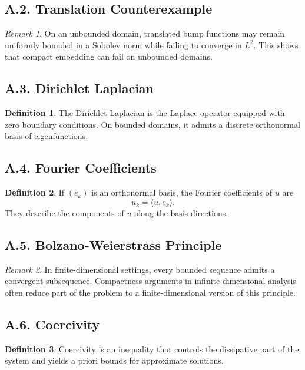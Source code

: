\documentclass[11pt]{article}
\theoremstyle{definition}
\newtheorem{definition}{Definition}
\theoremstyle{remark}
\newtheorem{remark}{Remark}
\begin{document}
\subsection*{A.2. Translation Counterexample}
\begin{remark}
On an unbounded domain, translated bump functions may remain uniformly bounded in a Sobolev norm while failing to converge in \(L^2\). This shows that compact embedding can fail on unbounded domains.
\end{remark}

\subsection*{A.3. Dirichlet Laplacian}
\begin{definition}
The Dirichlet Laplacian is the Laplace operator equipped with zero boundary conditions. On bounded domains, it admits a discrete orthonormal basis of eigenfunctions.
\end{definition}

\subsection*{A.4. Fourier Coefficients}
\begin{definition}
If \((e_k)\) is an orthonormal basis, the Fourier coefficients of \(u\) are
\[
u_k=\langle u,e_k\rangle.
\]
They describe the components of \(u\) along the basis directions.
\end{definition}

\subsection*{A.5. Bolzano-Weierstrass Principle}
\begin{remark}
In finite-dimensional settings, every bounded sequence admits a convergent subsequence. Compactness arguments in infinite-dimensional analysis often reduce part of the problem to a finite-dimensional version of this principle.
\end{remark}

\subsection*{A.6. Coercivity}
\begin{definition}
Coercivity is an inequality that controls the dissipative part of the system and yields a priori bounds for approximate solutions.
\end{definition}
\end{document}
